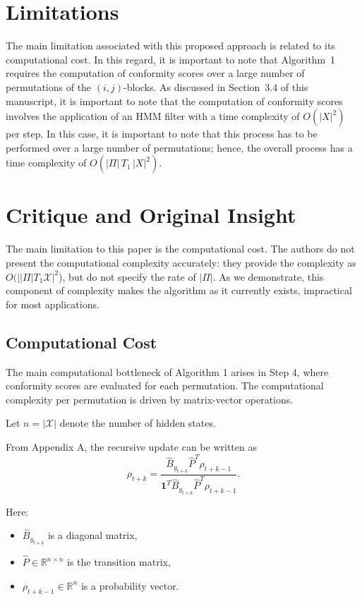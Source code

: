 \documentclass{article}
\begin{document}
\section{Limitations}

The main limitation associated with this proposed approach is related to its computational cost. 
In this regard, it is important to note that Algorithm~1 requires the computation of conformity 
scores over a large number of permutations of the $(i,j)$-blocks. As discussed in Section~3.4 
of this manuscript, it is important to note that the computation of conformity scores involves 
the application of an HMM filter with a time complexity of $O(|X|^2)$ per step. In this case, 
it is important to note that this process has to be performed over a large number of permutations; 
hence, the overall process has a time complexity of $O(|\Pi|\, T_1\, |X|^2)$.

\section{Critique and Original Insight}

The main limitation to this paper is the computational cost. The authors do not present the computational complexity accurately: they provide the complexity as $O(||\Pi| T_1\mathcal{X}|^2$), but do not specify the rate of $|\Pi|$. As we demonstrate, this component of complexity makes the algorithm as it currently exists, impractical for most applications.

\subsection*{Computational Cost}

The main computational bottleneck of Algorithm 1 arises in Step 4, where conformity scores are evaluated for each permutation. The computational complexity per permutation is driven by matrix-vector operations.

Let $n = |\mathcal{X}|$ denote the number of hidden states.

From Appendix A, the recursive update can be written as
\[
\rho_{t+k} =
\frac{\widehat{B}_{y_{t+k}} \widehat{P}^T \rho_{t+k-1}}
{\mathbf{1}^T \widehat{B}_{y_{t+k}} \widehat{P}^T \rho_{t+k-1}}.
\]

Here:
\begin{itemize}
    \item $\widehat{B}_{y_{t+k}}$ is a diagonal matrix,
    \item $\widehat{P} \in \mathbb{R}^{n \times n}$ is the transition matrix,
    \item $\rho_{t+k-1} \in \mathbb{R}^n$ is a probability vector.
\end{itemize}
\end{document}
